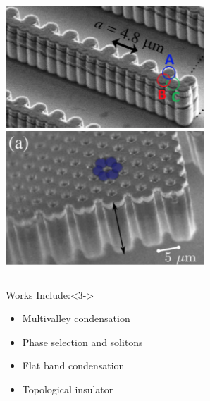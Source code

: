 \documentclass[9pt]{beamer}
\begin{document}
\begin{frame}[t]
\begin{onlyenv}
\begin{center}
\begin{columns}
\includegraphics[width=0.825\textwidth]{./fig/lattice2.png}\\
\includegraphics[width=0.825\textwidth]{./fig/lattice1.png}\\
\end{columns}
\end{center}
\end{onlyenv}

\begin{center}
\begin{block}{Works Include:}<3->
\begin{itemize}
\item Multivalley condensation~\cite{Sun:2017ab}
\item Phase selection and solitons~\cite{Yoon:2019aa}
\item Flat band condensation~\cite{Sun:2018aa,Ko:20}
\item Topological insulator~\cite{Sun:2019ab}
\end{itemize}
\end{block}
\end{center}


\end{frame}
\end{document}
